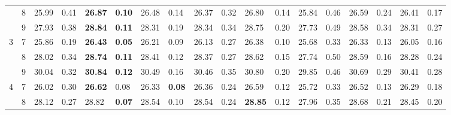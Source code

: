 \documentclass[conference]{IEEEtran}
\begin{document}
\begin{table*}[]
\begin{tabular}{|cc|ll|ll|ll|ll|ll|ll|ll|ll|}
		\multicolumn{1}{|c|}{} & 8 & \multicolumn{1}{l|}{25.99} & 0.41 & \multicolumn{1}{l|}{\textbf{26.87}} & \textbf{0.10} & \multicolumn{1}{l|}{26.48} & 0.14 & \multicolumn{1}{l|}{26.37} & 0.32 & \multicolumn{1}{l|}{26.80} & 0.14 & \multicolumn{1}{l|}{25.84} & 0.46 & \multicolumn{1}{l|}{26.59} & 0.24 & \multicolumn{1}{l|}{26.41} & 0.17 \\ \cline{2-18} 
		\multicolumn{1}{|c|}{} & 9 & \multicolumn{1}{l|}{27.93} & 0.38 & \multicolumn{1}{l|}{\textbf{28.84}} & \textbf{0.11} & \multicolumn{1}{l|}{28.31} & 0.19 & \multicolumn{1}{l|}{28.34} & 0.34 & \multicolumn{1}{l|}{28.75} & 0.20 & \multicolumn{1}{l|}{27.73} & 0.49 & \multicolumn{1}{l|}{28.58} & 0.34 & \multicolumn{1}{l|}{28.31} & 0.27 \\ \hline
		\multicolumn{1}{|c|}{\multirow{3}{*}{3}} & 7 & \multicolumn{1}{l|}{25.86} & 0.19 & \multicolumn{1}{l|}{\textbf{26.43}} & \textbf{0.05} & \multicolumn{1}{l|}{26.21} & 0.09 & \multicolumn{1}{l|}{26.13} & 0.27 & \multicolumn{1}{l|}{26.38} & 0.10 & \multicolumn{1}{l|}{25.68} & 0.33 & \multicolumn{1}{l|}{26.33} & 0.13 & \multicolumn{1}{l|}{26.05} & 0.16 \\ \cline{2-18} 
		\multicolumn{1}{|c|}{} & 8 & \multicolumn{1}{l|}{28.02} & 0.34 & \multicolumn{1}{l|}{\textbf{28.74}} & \textbf{0.11} & \multicolumn{1}{l|}{28.41} & 0.12 & \multicolumn{1}{l|}{28.37} & 0.27 & \multicolumn{1}{l|}{28.62} & 0.15 & \multicolumn{1}{l|}{27.74} & 0.50 & \multicolumn{1}{l|}{28.59} & 0.16 & \multicolumn{1}{l|}{28.28} & 0.24 \\ \cline{2-18} 
		\multicolumn{1}{|c|}{} & 9 & \multicolumn{1}{l|}{30.04} & 0.32 & \multicolumn{1}{l|}{\textbf{30.84}} & \textbf{0.12} & \multicolumn{1}{l|}{30.49} & 0.16 & \multicolumn{1}{l|}{30.46} & 0.35 & \multicolumn{1}{l|}{30.80} & 0.20 & \multicolumn{1}{l|}{29.85} & 0.46 & \multicolumn{1}{l|}{30.69} & 0.29 & \multicolumn{1}{l|}{30.41} & 0.28 \\ \hline
		\multicolumn{1}{|c|}{\multirow{3}{*}{4}} & 7 & \multicolumn{1}{l|}{26.02} & 0.30 & \multicolumn{1}{l|}{\textbf{26.62}} & 0.08 & \multicolumn{1}{l|}{26.33} & \textbf{0.08} & \multicolumn{1}{l|}{26.36} & 0.24 & \multicolumn{1}{l|}{26.59} & 0.12 & \multicolumn{1}{l|}{25.72} & 0.33 & \multicolumn{1}{l|}{26.52} & 0.13 & \multicolumn{1}{l|}{26.29} & 0.18 \\ \cline{2-18} 
		\multicolumn{1}{|c|}{} & 8 & \multicolumn{1}{l|}{28.12} & 0.27 & \multicolumn{1}{l|}{28.82} & \textbf{0.07} & \multicolumn{1}{l|}{28.54} & 0.10 & \multicolumn{1}{l|}{28.54} & 0.24 & \multicolumn{1}{l|}{\textbf{28.85}} & 0.12 & \multicolumn{1}{l|}{27.96} & 0.35 & \multicolumn{1}{l|}{28.68} & 0.21 & \multicolumn{1}{l|}{28.45} & 0.20 \\ \cline{2-18} 

\end{tabular}
\end{table*}
\end{document}

